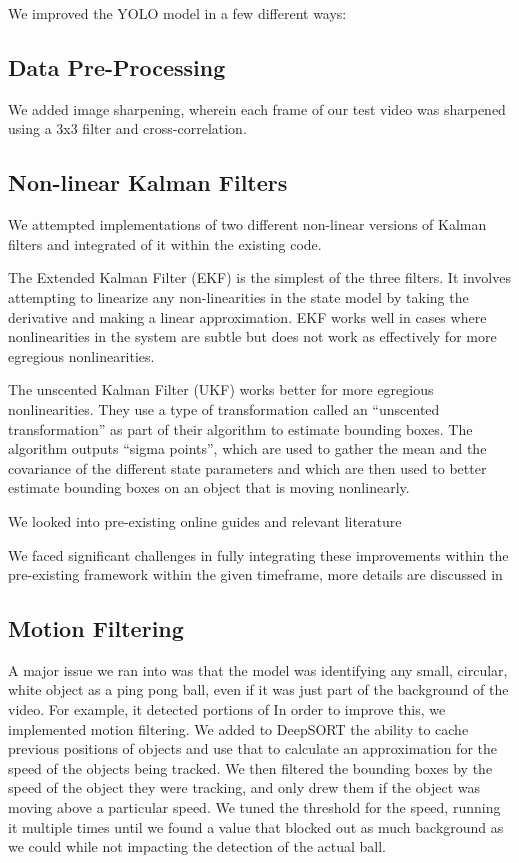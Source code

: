 \documentclass[10pt,twocolumn,letterpaper]{article}
\begin{document}
We improved the YOLO model in a few different ways:

\subsection{Data Pre-Processing}

We added image sharpening, wherein each frame of our test video was sharpened using a 3x3 filter and cross-correlation. 

\subsection{Non-linear Kalman Filters}

We attempted implementations of two different non-linear versions of Kalman filters and integrated of it within the existing code. 

The Extended Kalman Filter (EKF) is the simplest of the three filters. 
It involves attempting to linearize any non-linearities in the state model by taking the derivative and making a linear approximation. 
EKF works well in cases where nonlinearities in the system are subtle but does not work as effectively for more egregious nonlinearities.

The unscented Kalman Filter (UKF) works better for more egregious nonlinearities. 
They use a type of transformation called an “unscented transformation” as part of their algorithm to estimate bounding boxes. 
The algorithm outputs “sigma points”, which are used to gather the mean and the covariance of the different state parameters 
and which are then used to better estimate bounding boxes on an object that is moving nonlinearly.

We looked into pre-existing online guides and relevant literature 

We faced significant challenges in fully integrating these improvements within the pre-existing framework within the given timeframe,
more details are discussed in %
\subsection{Motion Filtering}
A major issue we ran into was that the model was identifying any small, circular, white object as a ping pong ball, even if it was just part of the background of the video. 
For example, it detected portions of 
In order to improve this, we implemented motion filtering. We added to DeepSORT the ability to cache previous positions of objects and use that to calculate an approximation for the speed of the objects being tracked. We then filtered the bounding boxes by the speed of the object they were tracking, and only drew them if the object was moving above a particular speed. We tuned the threshold for the speed, running it multiple times until we found a value that blocked out as much background as we could while not impacting the detection of the actual ball.
\end{document}
